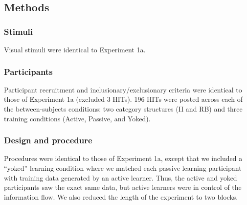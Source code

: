 \documentclass[10pt, letterpaper]{article}
\begin{document}
\subsection{Methods}\label{methods-1}

\subsubsection{Stimuli}\label{stimuli-1}

Visual stimuli were identical to Experiment 1a.

\subsubsection{Participants}\label{participants-1}

Participant recruitment and inclusionary/exclusionary criteria were
identical to those of Experiment 1a (excluded 3 HITs). 196 HITs were
posted across each of the between-subjects conditions: two category
structures (II and RB) and three training conditions (Active, Passive,
and Yoked).

\subsubsection{Design and procedure}\label{design-and-procedure-1}

Procedures were identical to those of Experiment 1a, except that we
included a ``yoked'' learning condition where we matched each passive
learning participant with training data generated by an active learner.
Thus, the active and yoked participants saw the exact same data, but
active learners were in control of the information flow. We also reduced
the length of the experiment to two blocks.
\end{document}
